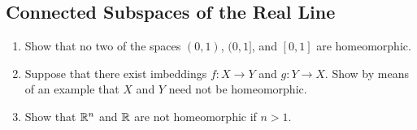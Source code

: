 \subsection{Connected Subspaces of the Real Line}

\begin{exercise}[ID=3.24.1]
  \begin{enumerate}[label={(\alph*)}, align=left, leftmargin=\parindent, listparindent=\parindent, labelwidth=0pt, itemindent=!]
    \item
      Show that no two of the spaces $(0, 1)$, $(0, 1]$, and $[0, 1]$ are homeomorphic.
    \item
      Suppose that there exist imbeddings $f: X \rightarrow Y$ and $g: Y \rightarrow X$.
      Show by means of an example that $X$ and $Y$ need not be homeomorphic.
    \item 
      Show that $\mathbb{R}^n$ and $\mathbb{R}$ are not homeomorphic if $n > 1$.
    \end{enumerate}
\end{exercise}
%
